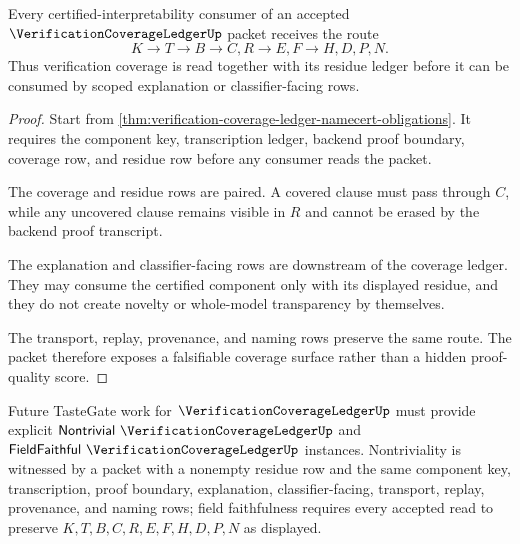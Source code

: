 \begin{theorem}
\label{thm:verification-coverage-ledger-residue-handoff}
Every certified-interpretability consumer of an accepted $\VerificationCoverageLedgerUp$ packet receives the route
$$
K \longrightarrow T \longrightarrow B \longrightarrow C,R \longrightarrow E,F \longrightarrow H,D,P,N .
$$
Thus verification coverage is read together with its residue ledger before it can be consumed by scoped explanation or classifier-facing rows.
\end{theorem}
\begin{proof}
Start from \autoref{thm:verification-coverage-ledger-namecert-obligations}. It requires the component key, transcription ledger, backend proof boundary, coverage row, and residue row before any consumer reads the packet.

The coverage and residue rows are paired. A covered clause must pass through $C$, while any uncovered clause remains visible in $R$ and cannot be erased by the backend proof transcript.

The explanation and classifier-facing rows are downstream of the coverage ledger. They may consume the certified component only with its displayed residue, and they do not create novelty or whole-model transparency by themselves.

The transport, replay, provenance, and naming rows preserve the same route. The packet therefore exposes a falsifiable coverage surface rather than a hidden proof-quality score.
\end{proof}



Future TasteGate work for $\VerificationCoverageLedgerUp$ must provide explicit $\mathsf{Nontrivial}\ \VerificationCoverageLedgerUp$ and $\mathsf{FieldFaithful}\ \VerificationCoverageLedgerUp$ instances. Nontriviality is witnessed by a packet with a nonempty residue row and the same component key, transcription, proof boundary, explanation, classifier-facing, transport, replay, provenance, and naming rows; field faithfulness requires every accepted read to preserve $K,T,B,C,R,E,F,H,D,P,N$ as displayed.

